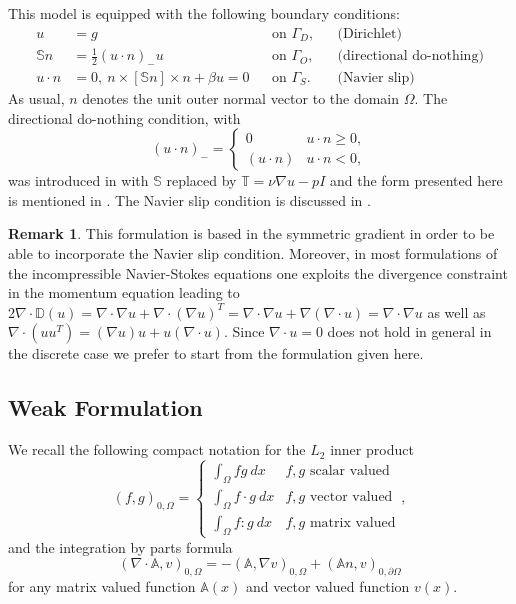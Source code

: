 \documentclass[a4paper,12pt]{article}
\theoremstyle{definition}
\newtheorem{Rem}[Def]{Remark}
\begin{document}
This model is equipped with the following boundary conditions:
\begin{subequations}
\begin{align}
u &= g                             &&\text{on $\Gamma_D$}, &&\text{(Dirichlet)}\\
\mathbb{S} n &= \frac12 (u\cdot n)_- u  &&\text{on $\Gamma_O$}, &&\text{(directional do-nothing)}\\
u\cdot n &= 0, \ n\times [\mathbb{S} n] \times n + \beta u = 0 &&\text{on $\Gamma_S$}. &&\text{(Navier slip)}
\end{align}
\end{subequations}
As usual, $n$ denotes the unit outer normal vector to the domain $\Omega$. The directional do-nothing condition, with 
$$(u\cdot n)_- = \left\{\begin{array}{ll}
0 & u\cdot n \geq 0,\\
(u\cdot n) & u\cdot n < 0,
\end{array} \right. $$ was introduced in \cite{Braack2014} with $\mathbb{S}$ replaced
by $\mathbb{T} = \nu \nabla u - pI$ and the form presented here is mentioned in \cite{JohnLectureNotes}.
The Navier slip condition is discussed in \cite{Neustupa2007}.

\begin{Rem}
This formulation is based in the symmetric gradient in order to be able to incorporate the
Navier slip condition. Moreover, in most formulations of the incompressible Navier-Stokes equations one exploits
the divergence constraint in the momentum equation leading to $2\nabla\cdot\mathbb{D}(u) = \nabla\cdot\nabla u + \nabla\cdot(\nabla u)^T
=  \nabla\cdot\nabla u + \nabla(\nabla\cdot u) =  \nabla\cdot\nabla u$ as well as $\nabla\cdot(uu^T) = (\nabla u) u + u (\nabla\cdot u)$. Since 
$\nabla\cdot u = 0$ does not hold in general in the discrete case we prefer to start from the formulation given here.
\end{Rem}

\subsection{Weak Formulation}

We recall the following compact notation for the $L_2$ inner product $$(f,g)_{0,\Omega} = \left\{\begin{array}{ll}
\int_\Omega fg \ dx & \text{$f,g$ scalar valued}\\
\int_\Omega f\cdot g \ dx & \text{$f,g$ vector valued}\\
\int_\Omega f : g \ dx & \text{$f,g$ matrix valued}
\end{array}\right. ,$$
and the integration by parts formula 
$$(\nabla\cdot\mathbb{A},v)_{0,\Omega} = - (\mathbb{A},\nabla v)_{0,\Omega} + (\mathbb{A}n,v)_{0,\partial\Omega}$$
for any matrix valued function $\mathbb{A}(x)$ and vector valued function $v(x)$.  
\end{document}
